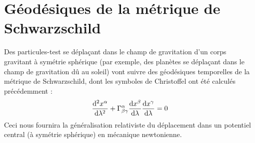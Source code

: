 \section{Géodésiques de la métrique de Schwarzschild}
Des particules-test se déplaçant dans le champ de gravitation d'un corps gravitant à symétrie sphérique (par exemple, des planètes se déplaçant dans le champ de gravitation dû au soleil) vont suivre des géodésiques temporelles de la métrique de Schwarzschild, dont les symboles de Christoffel ont été calculés précédemment :
\begin{equation}
    \label{eq: géodésiques pour la métrique de Schw}
    \frac{\mathrm{d}^2 x^\alpha}{\mathrm{d} \lambda^2} + \Gamma^\alpha_{\beta\gamma} \frac{\mathrm{d} x^\beta}{\mathrm{d} \lambda} \frac{\mathrm{d} x^\gamma}{\mathrm{d} \lambda} = 0
\end{equation}
Ceci nous fournira la généralisation relativiste du déplacement dans un potentiel central (à symétrie sphérique) en mécanique newtonienne.
